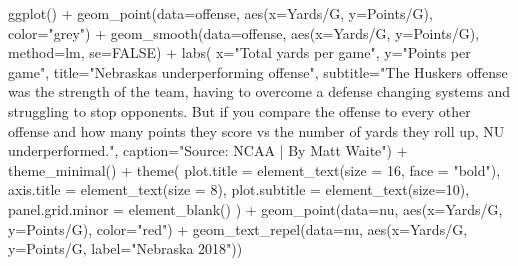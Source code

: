 \documentclass[
  letterpaper,
  DIV=11,
  numbers=noendperiod]{scrreprt}
\newenvironment{Shaded}{\begin{snugshade}}{\end{snugshade}}
\newcommand{\AttributeTok}[1]{\textcolor[rgb]{0.40,0.45,0.13}{#1}}
\newcommand{\ConstantTok}[1]{\textcolor[rgb]{0.56,0.35,0.01}{#1}}
\newcommand{\DecValTok}[1]{\textcolor[rgb]{0.68,0.00,0.00}{#1}}
\newcommand{\FunctionTok}[1]{\textcolor[rgb]{0.28,0.35,0.67}{#1}}
\newcommand{\NormalTok}[1]{\textcolor[rgb]{0.00,0.23,0.31}{#1}}
\newcommand{\SpecialCharTok}[1]{\textcolor[rgb]{0.37,0.37,0.37}{#1}}
\newcommand{\StringTok}[1]{\textcolor[rgb]{0.13,0.47,0.30}{#1}}
\begin{document}
\begin{Shaded}
\begin{Highlighting}[]
\FunctionTok{ggplot}\NormalTok{() }\SpecialCharTok{+} 
  \FunctionTok{geom\_point}\NormalTok{(}\AttributeTok{data=}\NormalTok{offense, }\FunctionTok{aes}\NormalTok{(}\AttributeTok{x=}\StringTok{\textasciigrave{}}\AttributeTok{Yards/G}\StringTok{\textasciigrave{}}\NormalTok{, }\AttributeTok{y=}\StringTok{\textasciigrave{}}\AttributeTok{Points/G}\StringTok{\textasciigrave{}}\NormalTok{), }\AttributeTok{color=}\StringTok{"grey"}\NormalTok{) }\SpecialCharTok{+} 
  \FunctionTok{geom\_smooth}\NormalTok{(}\AttributeTok{data=}\NormalTok{offense, }\FunctionTok{aes}\NormalTok{(}\AttributeTok{x=}\StringTok{\textasciigrave{}}\AttributeTok{Yards/G}\StringTok{\textasciigrave{}}\NormalTok{, }\AttributeTok{y=}\StringTok{\textasciigrave{}}\AttributeTok{Points/G}\StringTok{\textasciigrave{}}\NormalTok{), }\AttributeTok{method=}\NormalTok{lm, }\AttributeTok{se=}\ConstantTok{FALSE}\NormalTok{) }\SpecialCharTok{+} 
  \FunctionTok{labs}\NormalTok{(}
    \AttributeTok{x=}\StringTok{"Total yards per game"}\NormalTok{, }
    \AttributeTok{y=}\StringTok{"Points per game"}\NormalTok{, }
    \AttributeTok{title=}\StringTok{"Nebraska\textquotesingle{}s underperforming offense"}\NormalTok{, }
    \AttributeTok{subtitle=}\StringTok{"The Husker\textquotesingle{}s offense was the strength of the team, having to overcome a defense changing systems and struggling to stop opponents. But if you compare the offense to every other offense and how many points they score vs the number of yards they roll up, NU underperformed."}\NormalTok{, }
    \AttributeTok{caption=}\StringTok{"Source: NCAA | By Matt Waite"}\NormalTok{) }\SpecialCharTok{+} 
  \FunctionTok{theme\_minimal}\NormalTok{() }\SpecialCharTok{+} 
  \FunctionTok{theme}\NormalTok{(}
    \AttributeTok{plot.title =} \FunctionTok{element\_text}\NormalTok{(}\AttributeTok{size =} \DecValTok{16}\NormalTok{, }\AttributeTok{face =} \StringTok{"bold"}\NormalTok{),}
    \AttributeTok{axis.title =} \FunctionTok{element\_text}\NormalTok{(}\AttributeTok{size =} \DecValTok{8}\NormalTok{), }
    \AttributeTok{plot.subtitle =} \FunctionTok{element\_text}\NormalTok{(}\AttributeTok{size=}\DecValTok{10}\NormalTok{), }
    \AttributeTok{panel.grid.minor =} \FunctionTok{element\_blank}\NormalTok{()}
\NormalTok{    ) }\SpecialCharTok{+}
  \FunctionTok{geom\_point}\NormalTok{(}\AttributeTok{data=}\NormalTok{nu, }\FunctionTok{aes}\NormalTok{(}\AttributeTok{x=}\StringTok{\textasciigrave{}}\AttributeTok{Yards/G}\StringTok{\textasciigrave{}}\NormalTok{, }\AttributeTok{y=}\StringTok{\textasciigrave{}}\AttributeTok{Points/G}\StringTok{\textasciigrave{}}\NormalTok{), }\AttributeTok{color=}\StringTok{"red"}\NormalTok{) }\SpecialCharTok{+} 
  \FunctionTok{geom\_text\_repel}\NormalTok{(}\AttributeTok{data=}\NormalTok{nu, }\FunctionTok{aes}\NormalTok{(}\AttributeTok{x=}\StringTok{\textasciigrave{}}\AttributeTok{Yards/G}\StringTok{\textasciigrave{}}\NormalTok{, }\AttributeTok{y=}\StringTok{\textasciigrave{}}\AttributeTok{Points/G}\StringTok{\textasciigrave{}}\NormalTok{, }\AttributeTok{label=}\StringTok{"Nebraska 2018"}\NormalTok{))}
\end{Highlighting}
\end{Shaded}
\end{document}
